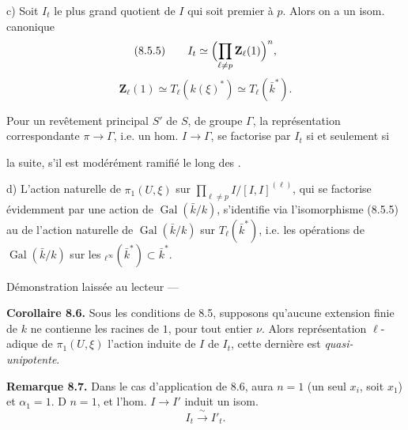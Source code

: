 \documentclass[11pt,a4paper]{article}
\begin{document}
c) Soit $I_t$ le plus grand quotient de $I$ qui soit \ill{} \ill{} premier à $p$. Alors on a un isom. canonique
\[
(8.5.5) \qquad I_t \simeq \Bigl(\prod_{\ell \neq p} \mathbf{Z}_\ell(1)\Bigr)^n ,
\]
\[
\mathbf{Z}_\ell(1) \simeq T_\ell(k(\xi)^*) \simeq T_\ell(\bar k^*) .
\]

Pour un revêtement principal \struck{\ill{}} \ill{} $S'$ de $S$, de groupe $\Gamma$, la représentation correspondante $\pi \to \Gamma$, i.e. un hom. $I \to \Gamma$,  se factorise par $I_t$ si et seulement si \struck{\ill{}}

\ill{} la suite, s'il est modérément ramifié le long des  .

d) L'action naturelle de $\pi_1(U,\xi)$ sur  $\prod_{\ell \neq p} I/[I,I]^{(\ell)}$, qui se factorise \struck{\ill{}} évidemment par une action de $\operatorname{Gal}(\bar k/k)$, s'identifie via l'isomorphisme (8.5.5) \struck{\ill{} \ill{}} au  de l'action naturelle de $\operatorname{Gal}(\bar k/k)$ sur $T_\ell(\bar k^*)$, \struck{\ill{}} i.e. les opérations de $\operatorname{Gal}(\bar k/k)$ sur les ${}_{\ell^\infty}(\bar k^*) \subset \bar k^*$.

Démonstration laissée au lecteur ---

\textbf{Corollaire 8.6.} Sous les conditions de 8.5, supposons qu'aucune extension finie de $k$ ne contienne \ill{} les racines \ill{} de $1$, pour tout entier $\nu$. Alors \ill{} \ill{} représentation $\ell$-adique de $\pi_1(U,\xi)$  l'action induite de $I$  de $I_t$,  cette dernière est \emph{quasi-unipotente}.

\textbf{Remarque 8.7.}   Dans le cas d'application de 8.6, \ill{} aura \struck{\ill{}} $n = 1$ (un seul $x_i$, soit $x_1$) et $\alpha_1 = 1$. D  $n = 1$, et l'hom. $I \to I'$ induit un isom.
\[
I_t \xrightarrow{\ \sim\ } I'_t .
\]
\end{document}
